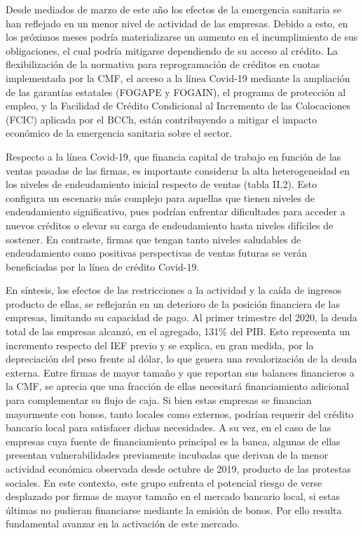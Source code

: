 \documentclass[
]{book}
\begin{document}
Desde mediados de marzo de este año los efectos de la emergencia sanitaria
se han reflejado en un menor nivel de actividad de las empresas. Debido a esto,
en los próximos meses podría materializarse un aumento en el incumplimiento
de sus obligaciones, el cual podría mitigarse dependiendo de su acceso al
crédito. La flexibilización de la normativa para reprogramación de créditos en
cuotas implementada por la CMF, el acceso a la línea Covid-19 mediante la
ampliación de las garantías estatales (FOGAPE y FOGAIN), el programa de
protección al empleo, y la Facilidad de Crédito Condicional al Incremento de
las Colocaciones (FCIC) aplicada por el BCCh, están contribuyendo a mitigar el
impacto económico de la emergencia sanitaria sobre el sector.

Respecto a la línea Covid-19, que financia capital de trabajo en función de las
ventas pasadas de las firmas, es importante considerar la alta heterogeneidad
en los niveles de endeudamiento inicial respecto de ventas (tabla II.2).
Esto configura un escenario más complejo para aquellas que tienen niveles
de endeudamiento significativo, pues podrían enfrentar dificultades para
acceder a nuevos créditos o elevar su carga de endeudamiento hasta niveles
difíciles de sostener. En contraste, firmas que tengan tanto niveles saludables
de endeudamiento como positivas perspectivas de ventas futuras se verán
beneficiadas por la línea de crédito Covid-19.

En síntesis, los efectos de las restricciones a la actividad y la caída de ingresos
producto de ellas, se reflejarán en un deterioro de la posición financiera de
las empresas, limitando su capacidad de pago. Al primer trimestre del 2020,
la deuda total de las empresas alcanzó, en el agregado, 131\% del PIB. Esto
representa un incremento respecto del IEF previo y se explica, en gran medida,
por la depreciación del peso frente al dólar, lo que genera una revalorización
de la deuda externa. Entre firmas de mayor tamaño y que reportan sus
balances financieros a la CMF, se aprecia que una fracción de ellas necesitará
financiamiento adicional para complementar su flujo de caja. Si bien estas
empresas se financian mayormente con bonos, tanto locales como externos,
podrían requerir del crédito bancario local para satisfacer dichas necesidades.
A su vez, en el caso de las empresas cuya fuente de financiamiento principal es
la banca, algunas de ellas presentan vulnerabilidades previamente incubadas
que derivan de la menor actividad económica observada desde octubre de
2019, producto de las protestas sociales. En este contexto, este grupo enfrenta
el potencial riesgo de verse desplazado por firmas de mayor tamaño en el
mercado bancario local, si estas últimas no pudieran financiarse mediante la
emisión de bonos. Por ello resulta fundamental avanzar en la activación de este
mercado.
\end{document}
